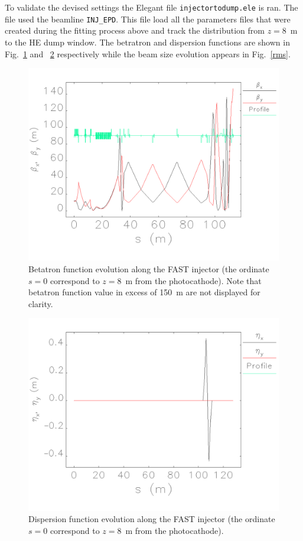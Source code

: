 \documentclass[notitlepage,twocolumn,nofootinbib,showpacs,preprintnumbers,superscriptaddress,amsmath,amssymb]{revtex4-1}
\newcommand{\elegant}{{\sc Elegant }}
\begin{document}
To validate the devised settings the \elegant file {\tt injectortodump.ele} is ran. The file used the beamline {\tt INJ\_EPD}. This file load all the parameters files that were created during the fitting process above and track the distribution from $z=8$~m to the HE dump window. The betratron and dispersion functions are shown in Fig.~\ref{CS1} and  ~\ref{CS2} respectively while the beam size evolution appears in Fig.~\ref{rms}. 
%
\begin{figure}[hhhh!!!]
\begin{center}
 \includegraphics[width=0.95\linewidth]{injectortodump_twiss.pdf}
\caption{Betatron function evolution along the FAST injector (the ordinate $s=0$ correspond to $z=8$~m from the photocathode). Note that betatron function value in excess of 150~m are not displayed for clarity.\label{CS1} }
\end{center}
\end{figure}
\begin{figure}[hhhhh!!!!]
\begin{center}
 \includegraphics[width=0.95\linewidth]{injectortodump_eta.pdf}
\caption{Dispersion function evolution along the FAST injector (the ordinate $s=0$ correspond to $z=8$~m from the photocathode). \label{CS2} }
\end{center}
\end{figure}
\end{document}
